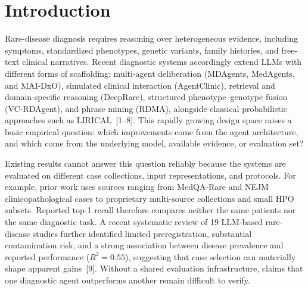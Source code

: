 \documentclass[letterpaper]{article} %
\begin{document}
\section{Introduction}

Rare-disease diagnosis requires reasoning over heterogeneous evidence, including symptoms, standardized phenotypes, genetic variants, family histories, and free-text clinical narratives. Recent diagnostic systems accordingly extend LLMs with different forms of scaffolding: multi-agent deliberation (MDAgents, MedAgents, and MAI-DxO), simulated clinical interaction (AgentClinic), retrieval and domain-specific reasoning (DeepRare), structured phenotype--genotype fusion (VC-RDAgent), and phrase mining (RDMA), alongside classical probabilistic approaches such as LIRICAL~[1--8]. This rapidly growing design space raises a basic empirical question: which improvements come from the agent architecture, and which come from the underlying model, available evidence, or evaluation set?

Existing results cannot answer this question reliably because the systems are evaluated on different case collections, input representations, and protocols. For example, prior work uses sources ranging from MedQA-Rare and NEJM clinicopathological cases to proprietary multi-source collections and small HPO subsets. Reported top-1 recall therefore compares neither the same patients nor the same diagnostic task. A recent systematic review of 19 LLM-based rare-disease studies further identified limited preregistration, substantial contamination risk, and a strong association between disease prevalence and reported performance ($R^2=0.55$), suggesting that case selection can materially shape apparent gains~[9]. Without a shared evaluation infrastructure, claims that one diagnostic agent outperforms another remain difficult to verify.
\end{document}
